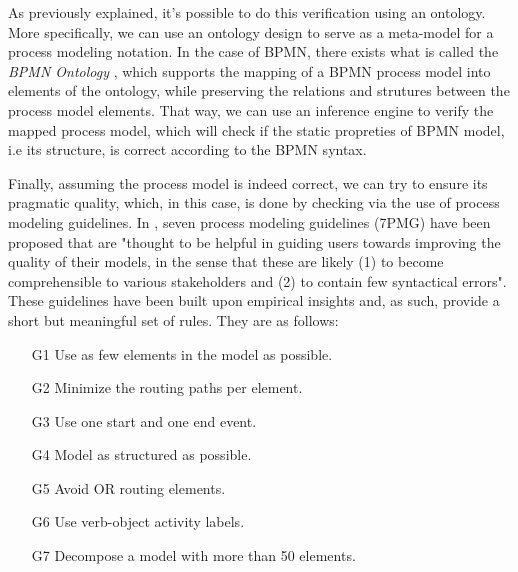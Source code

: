 \documentclass[a4paper,twoside]{article}
\begin{document}
As previously explained, it's possible to do this verification using an ontology. More specifically, we can use an ontology design to serve as a meta-model for a process modeling notation. In the case of BPMN, there exists what is called the \textit{BPMN Ontology} \cite{Rospocher2014foisbpmn}, which supports the mapping of a BPMN process model into elements of the ontology, while preserving the relations and strutures between the process model elements. That way, we can use an inference engine to verify the mapped process model, which will check if the static propreties of BPMN model, i.e its structure, is correct according to the BPMN syntax.



Finally, assuming the process model is indeed correct, we can try to ensure its pragmatic quality, which, in this case, is done by checking via the use of process modeling guidelines.  In \cite{Mendling2010}, seven process modeling guidelines (7PMG) have been proposed that are "thought to be helpful in guiding users towards improving the quality of their models, in the sense that these are likely (1) to become comprehensible to various stakeholders and (2) to contain few syntactical errors". These guidelines have been built upon empirical insights and, as such, provide a short but meaningful set of rules. They are as follows:
\begin{enumerate}
	\item[G1] Use as few elements in the model as possible.
	\item[G2] Minimize the routing paths per element.
	\item[G3] Use one start and one end event.
	\item[G4] Model as structured as possible. 
	\item[G5] Avoid OR routing elements.
	\item[G6] Use verb-object activity labels.
	\item[G7] Decompose a model with more than 50 elements.
\end{enumerate}
\end{document}
